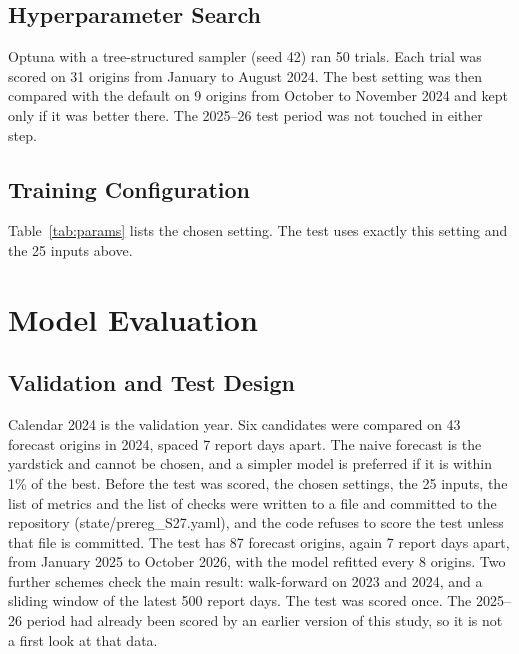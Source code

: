 \subsection{Hyperparameter Search}
Optuna \cite{optuna} with a tree-structured sampler (seed 42) ran 50 trials. Each trial was scored on 31 origins from January to August 2024. The best setting was then compared with the default on 9 origins from October to November 2024 and kept only if it was better there. The 2025--26 test period was not touched in either step.

\subsection{Training Configuration}
Table~\ref{tab:params} lists the chosen setting. The test uses exactly this setting and the 25 inputs above.

\begin{table}[H]\centering\small
\caption[Chosen LightGBM setting]{Chosen LightGBM setting.}\label{tab:params}

\par{}
\end{table}

\section{Model Evaluation}

\subsection{Validation and Test Design}
Calendar 2024 is the validation year. Six candidates were compared on 43 forecast origins in 2024, spaced 7 report days apart. The naive forecast is the yardstick and cannot be chosen, and a simpler model is preferred if it is within 1\% of the best. Before the test was scored, the chosen settings, the 25 inputs, the list of metrics and the list of checks were written to a file and committed to the repository (state/prereg\_S27.yaml), and the code refuses to score the test unless that file is committed. The test has 87 forecast origins, again 7 report days apart, from January 2025 to October 2026, with the model refitted every 8 origins. Two further schemes check the main result: walk-forward on 2023 and 2024, and a sliding window of the latest 500 report days. The test was scored once. The 2025--26 period had already been scored by an earlier version of this study, so it is not a first look at that data.

